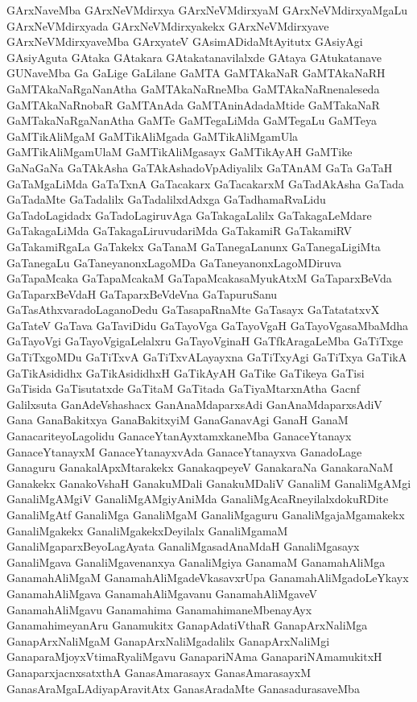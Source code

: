 {GArxNaveMba
GArxNeVMdirxya
GArxNeVMdirxyaM
GArxNeVMdirxyaMgaLu
GArxNeVMdirxyada
GArxNeVMdirxyakekx
GArxNeVMdirxyave
GArxNeVMdirxyaveMba
GArxyateV
GAsimADidaMtAyitutx
GAsiyAgi
GAsiyAguta
GAtaka
GAtakara
GAtakatanavilalxde
GAtaya
GAtukatanave
GUNaveMba
Ga
GaLige
GaLilane
GaMTA
GaMTAkaNaR
GaMTAkaNaRH
GaMTAkaNaRgaNanAtha
GaMTAkaNaRneMba
GaMTAkaNaRnenaleseda
GaMTAkaNaRnobaR
GaMTAnAda
GaMTAninAdadaMtide
GaMTakaNaR
GaMTakaNaRgaNanAtha
GaMTe
GaMTegaLiMda
GaMTegaLu
GaMTeya
GaMTikAliMgaM
GaMTikAliMgada
GaMTikAliMgamUla
GaMTikAliMgamUlaM
GaMTikAliMgasayx
GaMTikAyAH
GaMTike
GaNaGaNa
GaTAkAsha
GaTAkAshadoVpAdiyalilx
GaTAnAM
GaTa
GaTaH
GaTaMgaLiMda
GaTaTxnA
GaTacakarx
GaTacakarxM
GaTadAkAsha
GaTada
GaTadaMte
GaTadalilx
GaTadalilxdAdxga
GaTadhamaRvaLidu
GaTadoLagidadx
GaTadoLagiruvAga
GaTakagaLalilx
GaTakagaLeMdare
GaTakagaLiMda
GaTakagaLiruvudariMda
GaTakamiR
GaTakamiRV
GaTakamiRgaLa
GaTakekx
GaTanaM
GaTanegaLanunx
GaTanegaLigiMta
GaTanegaLu
GaTaneyanonxLagoMDa
GaTaneyanonxLagoMDiruva
GaTapaMcaka
GaTapaMcakaM
GaTapaMcakasaMyukAtxM
GaTaparxBeVda
GaTaparxBeVdaH
GaTaparxBeVdeVna
GaTapuruSanu
GaTasAthxvaradoLaganoDedu
GaTasapaRnaMte
GaTasayx
GaTatatatxvX
GaTateV
GaTava
GaTaviDidu
GaTayoVga
GaTayoVgaH
GaTayoVgasaMbaMdha
GaTayoVgi
GaTayoVgigaLelalxru
GaTayoVginaH
GaTfkAragaLeMba
GaTiTxge
GaTiTxgoMDu
GaTiTxvA
GaTiTxvALayayxna
GaTiTxyAgi
GaTiTxya
GaTikA
GaTikAsididhx
GaTikAsididhxH
GaTikAyAH
GaTike
GaTikeya
GaTisi
GaTisida
GaTisutatxde
GaTitaM
GaTitada
GaTiyaMtarxnAtha
Gacnf
Galilxsuta
GanAdeVshashacx
GanAnaMdaparxsAdi
GanAnaMdaparxsAdiV
Gana
GanaBakitxya
GanaBakitxyiM
GanaGanavAgi
GanaH
GanaM
GanacariteyoLagolidu
GanaceYtanAyxtamxkaneMba
GanaceYtanayx
GanaceYtanayxM
GanaceYtanayxvAda
GanaceYtanayxva
GanadoLage
Ganaguru
GanakalApxMtarakekx
GanakaqpeyeV
GanakaraNa
GanakaraNaM
Ganakekx
GanakoVshaH
GanakuMDali
GanakuMDaliV
GanaliM
GanaliMgAMgi
GanaliMgAMgiV
GanaliMgAMgiyAniMda
GanaliMgAcaRneyilalxdokuRDite
GanaliMgAtf
GanaliMga
GanaliMgaM
GanaliMgaguru
GanaliMgajaMgamakekx
GanaliMgakekx
GanaliMgakekxDeyilalx
GanaliMgamaM
GanaliMgaparxBeyoLagAyata
GanaliMgasadAnaMdaH
GanaliMgasayx
GanaliMgava
GanaliMgavenanxya
GanaliMgiya
GanamaM
GanamahAliMga
GanamahAliMgaM
GanamahAliMgadeVkasavxrUpa
GanamahAliMgadoLeYkayx
GanamahAliMgava
GanamahAliMgavanu
GanamahAliMgaveV
GanamahAliMgavu
Ganamahima
GanamahimaneMbenayAyx
GanamahimeyanAru
Ganamukitx
GanapAdatiVthaR
GanapArxNaliMga
GanapArxNaliMgaM
GanapArxNaliMgadalilx
GanapArxNaliMgi
GanaparaMjoyxVtimaRyaliMgavu
GanapariNAma
GanapariNAmamukitxH
GanaparxjacnxsatxthA
GanasAmarasayx
GanasAmarasayxM
GanasAraMgaLAdiyapAravitAtx
GanasAradaMte
GanasadurasaveMba
}
